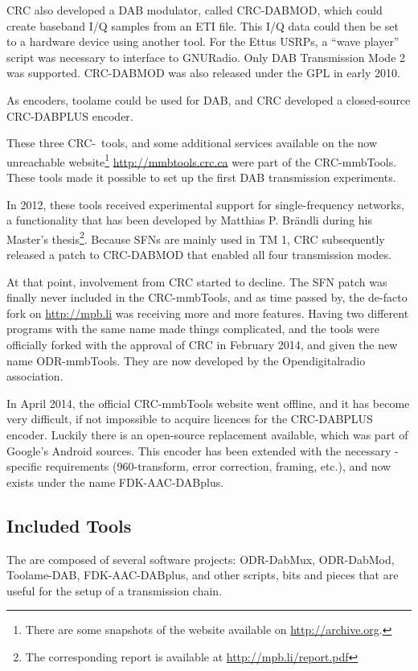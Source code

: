 CRC also developed a DAB modulator, called \mbox{CRC-DABMOD}, which could create
baseband I/Q samples from an ETI file. This I/Q data could then be set to
a hardware device using another tool. For the Ettus USRPs, a ``wave player''
script was necessary to interface to GNURadio. Only DAB Transmission Mode 2 was
supported. \mbox{CRC-DABMOD} was also released under the GPL in early 2010.

As encoders, toolame could be used for DAB, and CRC developed a closed-source
\mbox{CRC-DABPLUS} \dabplus encoder.

These three CRC-~tools, and some additional services available on the now
unreachable website\footnote{There are some snapshots of the website available
    on \url{http://archive.org}.} \url{http://mmbtools.crc.ca} were
part of the \mbox{CRC-mmbTools}. These tools made it possible to set up the
first DAB transmission experiments.

In 2012, these tools received experimental support for single-frequency
networks, a functionality that has been developed by Matthias P. Brändli during
his Master's thesis\footnote{The corresponding report is available at
    \url{http://mpb.li/report.pdf}}.
Because SFNs are mainly used in TM 1, CRC subsequently released a patch to
\mbox{CRC-DABMOD} that enabled all four transmission modes.

At that point, involvement from CRC started to decline. The SFN patch was
finally never included in the \mbox{CRC-mmbTools}, and as time passed by, the
de-facto fork on \url{http://mpb.li} was receiving more and more features.
Having two different programs with the same name made things complicated, and
the tools were officially forked with the approval of CRC in February 2014, and
given the new name \mbox{ODR-mmbTools}. They are now developed by the
Opendigitalradio association.

In April 2014, the official \mbox{CRC-mmbTools} website went offline, and it has
become very difficult, if not impossible to acquire licences for the
\mbox{CRC-DABPLUS} encoder. Luckily there is an open-source replacement
available, which was part of Google's Android sources. This encoder has been
extended with the necessary \dabplus{}-specific requirements (960-transform,
error correction, framing, etc.), and now exists under the name
\mbox{FDK-AAC-DABplus}.

\subsection{Included Tools}
The \mmbtools are composed of several software projects:
\mbox{ODR-DabMux}, \mbox{ODR-DabMod},
\mbox{Toolame-DAB}, \mbox{FDK-AAC-DABplus}, and other scripts, bits and pieces
that are useful for the setup of a transmission chain.

